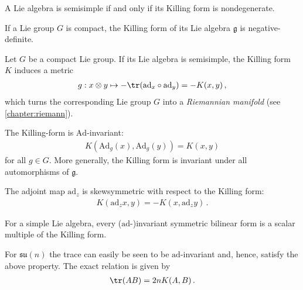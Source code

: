     \begin{theorem}
        A Lie algebra is semisimple if and only if its Killing form is nondegenerate.
    \end{theorem}

    \begin{property}
        If a Lie group $G$ is compact, the Killing form of its Lie algebra $\mathfrak{g}$ is negative-definite.
    \end{property}
    \begin{result}
        Let $G$ be a compact Lie group. If its Lie algebra is semisimple, the Killing form $K$ induces a metric
        \begin{gather}
            g:x\otimes y\mapsto-\tr(\mathrm{ad}_x\circ\mathrm{ad}_y) = -K(x,y)\,,
        \end{gather}
        which turns the corresponding Lie group $G$ into a \textit{Riemannian manifold} (see \cref{chapter:riemann}).
    \end{result}

    \begin{property}
        The Killing-form is $\mathrm{Ad}$-invariant:
        \begin{gather}
            K(\mathrm{Ad}_g(x),\mathrm{Ad}_g(y)) = K(x,y)
        \end{gather}
        for all $g\in G$. More generally, the Killing form is invariant under all automorphisms of $\mathfrak{g}$.
    \end{property}
    \begin{result}\label{lie:ad_killing_form}
        The adjoint map $\mathrm{ad}_z$ is skewsymmetric with respect to the Killing form:
        \begin{gather}
            K(\mathrm{ad}_zx,y) = -K(x,\mathrm{ad}_zy)\,.
        \end{gather}
    \end{result}

    \begin{property}\label{lie:killing_trace}
        For a simple Lie algebra, every ($\mathrm{ad}$-)invariant symmetric bilinear form is a scalar multiple of the Killing form.
    \end{property}
    \begin{example}
        For $\mathfrak{su}(n)$ the trace can easily be seen to be $\mathrm{ad}$-invariant and, hence, satisfy the above property. The exact relation is given by
        \begin{gather}
            \tr(AB) = 2nK(A,B)\,.
        \end{gather}
    \end{example}

